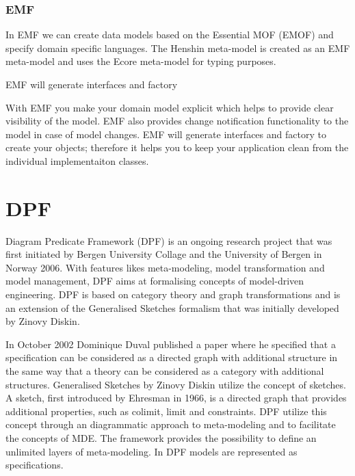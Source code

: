 \subsubsection{EMF}

In EMF we can create data models based on the Essential MOF (EMOF) and specify
domain specific languages. The Henshin meta-model is created as an EMF
meta-model and uses the Ecore meta-model for typing purposes.

EMF will generate interfaces and factory

With EMF you make your domain model explicit which helps to provide clear
visibility of the model. EMF also provides change notification functionality to
the model in case of model changes. EMF will generate interfaces and factory to
create your objects; therefore it helps you to keep your application clean from
the individual implementaiton classes.

\section{DPF}

Diagram Predicate Framework\cite{Rutle_thesis,Rossini_thesis,Lamo2013} (DPF) is
an ongoing research project that was first initiated by Bergen University
Collage and the University of Bergen in Norway 2006. With features likes
meta-modeling, model transformation and model management, DPF aims at
formalising concepts of model-driven engineering. DPF is based on category
theory and graph transformations and is an extension of the Generalised
Sketches\cite{Diskin2003} formalism that was initially developed by Zinovy
Diskin.

In October 2002 Dominique Duval published a paper where he specified that a
specification can be considered as a directed graph with additional structure
in the same way that a theory can be considered as a category with additional
structures\cite{Duval2003}. Generalised Sketches by Zinovy Diskin utilize the
concept of sketches. A sketch, first introduced by Ehresman in 1966, is a
directed graph that provides additional properties, such as colimit, limit and
constraints. DPF utilize this concept through an diagrammatic approach to
meta-modeling and to facilitate the concepts of MDE. The framework provides the
possibility to define an unlimited layers of meta-modeling. In DPF models are
represented as specifications. 

